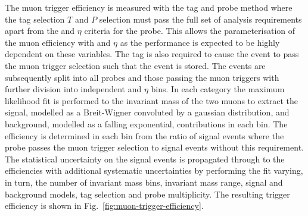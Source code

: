 The muon trigger efficiency is measured with the tag and probe method where
the tag selection $T$ and $P$ selection must pass the full set of analysis
requirements apart from the \pt and $\eta$ criteria for the probe. This allows
the parameterisation of the muon efficiency with \pt and $\eta$ as the
performance is expected to be highly dependent on these variables. The tag is
also required to cause the event to pass the muon trigger selection such that
the event is stored. The events are subsequently split into all probes and
those passing the muon triggers with further division into independent \pt and
$\eta$ bins. In each category the maximum likelihood fit is performed to the
invariant mass of the two muons to extract the signal, modelled as a
Breit-Wigner convoluted by a gaussian distribution, and background, modelled
as a falling exponential, contributions in each bin. The efficiency is
determined in each bin from the ratio of signal events where the probe passes
the muon trigger selection to signal events without this requirement. The
statistical uncertainty on the signal events is propagated through to the
efficiencies with additional systematic uncertainties by performing the fit
varying, in turn, the number of invariant mass bins, invariant mass range,
signal and background models, tag selection and probe multiplicity. The
resulting trigger efficiency is shown in Fig.~\ref{fig:muon-trigger-efficiency}.

